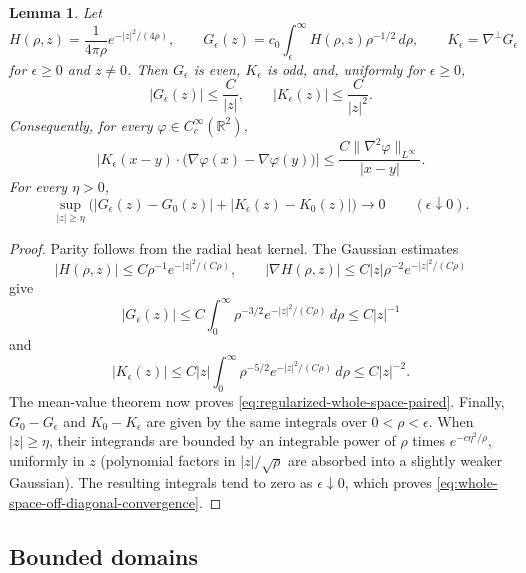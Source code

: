\documentclass[11pt,reqno]{amsproc}
\newtheorem{lemma}{Lemma}[section]
\newcommand{\R}{\mathbb R}
\newcommand{\dd}{\,d}
\begin{document}
\begin{lemma}
\label{lem:regularized-whole-space-kernel}
Let
\[
 H(\rho,z)=\frac1{4\pi\rho}e^{-|z|^2/(4\rho)},\qquad
 G_\epsilon(z)=c_0\int_\epsilon^\infty
 H(\rho,z)\rho^{-1/2}\dd\rho,\qquad
 K_\epsilon=\nabla^\perp G_\epsilon
\]
for $\epsilon\ge0$ and $z\ne0$.  Then $G_\epsilon$ is even,
$K_\epsilon$ is odd, and, uniformly for $\epsilon\ge0$,
\begin{equation}\label{eq:regularized-whole-space-bounds}
 |G_\epsilon(z)|\le \frac{C}{|z|},\qquad
 |K_\epsilon(z)|\le \frac{C}{|z|^2}.
\end{equation}
Consequently, for every $\varphi\in C_c^\infty(\R^2)$,
\begin{equation}\label{eq:regularized-whole-space-paired}
 \left|K_\epsilon(x-y)\cdot
 \bigl(\nabla\varphi(x)-\nabla\varphi(y)\bigr)\right|
 \le \frac{C\|\nabla^2\varphi\|_{L^\infty}}{|x-y|}.
\end{equation}
For every $\eta>0$,
\begin{equation}\label{eq:whole-space-off-diagonal-convergence}
 \sup_{|z|\ge\eta}
 \bigl(|G_\epsilon(z)-G_0(z)|
       +|K_\epsilon(z)-K_0(z)|\bigr)\longrightarrow0
 \qquad(\epsilon\downarrow0).
\end{equation}
\end{lemma}

\begin{proof}
Parity follows from the radial heat kernel.  The Gaussian estimates
\[
 |H(\rho,z)|\le C\rho^{-1}e^{-|z|^2/(C\rho)},
 \qquad
 |\nabla H(\rho,z)|
 \le C|z|\rho^{-2}e^{-|z|^2/(C\rho)}
\]
give
\[
 |G_\epsilon(z)|
 \le C\int_0^\infty \rho^{-3/2}e^{-|z|^2/(C\rho)}\dd\rho
 \le C|z|^{-1}
\]
and
\[
 |K_\epsilon(z)|
 \le C|z|\int_0^\infty
 \rho^{-5/2}e^{-|z|^2/(C\rho)}\dd\rho
 \le C|z|^{-2}.
\]
The mean-value theorem now proves
\eqref{eq:regularized-whole-space-paired}.  Finally,
$G_0-G_\epsilon$ and $K_0-K_\epsilon$ are given by the same integrals over
$0<\rho<\epsilon$.  When $|z|\ge\eta$, their integrands are bounded by an
integrable power of $\rho$ times $e^{-c\eta^2/\rho}$, uniformly in $z$
(polynomial factors in $|z|/\sqrt\rho$ are absorbed into a slightly weaker
Gaussian).  The resulting integrals tend to zero as $\epsilon\downarrow0$,
which proves \eqref{eq:whole-space-off-diagonal-convergence}.
\end{proof}

\subsection{Bounded domains}
\end{document}
